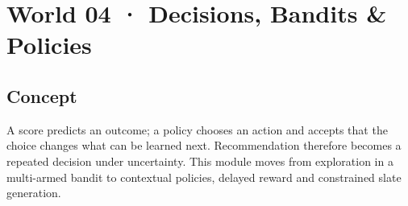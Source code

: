 \section{World 04 · Decisions, Bandits \& Policies}

\begin{abstract}
A model estimates; a policy acts. Exploration is the price of learning what the current policy cannot yet know.
\end{abstract}

\subsection{Concept}
A score predicts an outcome; a policy chooses an action and accepts that the choice changes what can be learned next. Recommendation therefore becomes a repeated decision under uncertainty. This module moves from exploration in a multi-armed bandit to contextual policies, delayed reward and constrained slate generation.
